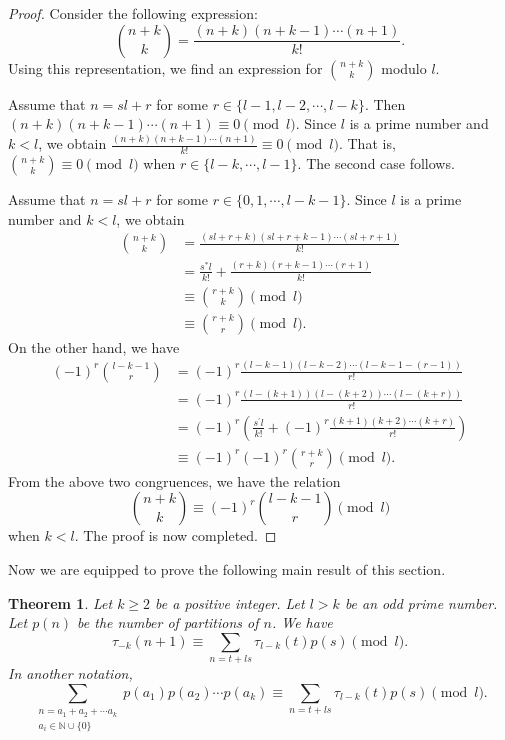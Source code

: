 \documentclass[10pt]{article}
\newtheorem{theorem}{Theorem}[section]
\theoremstyle{definition}
\begin{document}
\begin{proof}
Consider the following expression:
\[{{n+k}\choose{k}}=\frac{(n+k)(n+k-1)\cdots (n+1)}{k!}.
\]
Using this representation, we find an expression for ${n+k}\choose{k}$ modulo $l$. 

Assume that $n=sl+r$ for some $r\in\{l-1,l-2,\cdots ,l-k\}$. Then $(n+k)(n+k-1)\cdots (n+1)\equiv 0\pmod{l}$. Since $l$ is a prime number and $k<l$, we obtain $\frac{(n+k)(n+k-1)\cdots (n+1)}{k!}\equiv0\pmod{l}$. That is, ${{n+k}\choose{k}}\equiv 0\pmod{l}$ when $r\in\{l-k,\cdots ,l-1\}$. The second case follows. 

Assume that $n=sl+r$ for some $r\in\{0,1,\cdots ,l-k-1\}$. Since $l$ is a prime number and $k<l$, we obtain
\begin{align*}
{{n+k}\choose{k}}&=\frac{(sl+r+k)(sl+r+k-1)\cdots (sl+r+1)}{k!}\\
&=\frac{s^{*}l}{k!}+\frac{(r+k)(r+k-1)\cdots (r+1)}{k!}\\
&\equiv {{r+k}\choose {k}}\pmod{l}\\
&\equiv{{r+k}\choose{r}}\pmod{l}.
\end{align*}
On the other hand, we have
\begin{align*}
(-1)^r{{l-k-1}\choose{r}}&=(-1)^r\frac{(l-k-1)(l-k-2)\cdots (l-k-1-(r-1))}{r!}\\
&=(-1)^r\frac{(l-(k+1))(l-(k+2))\cdots (l-(k+r))}{r!}\\
&=(-1)^r\left(\frac{s^{'}l}{k!}+(-1)^r\frac{(k+1)(k+2)\cdots (k+r)}{r!}\right)\\
&\equiv (-1)^r(-1)^r{{r+k}\choose{r}}\pmod{l}.
\end{align*}
From the above two congruences, we have the relation
\[{{n+k}\choose{k}}\equiv(-1)^r{{l-k-1}\choose{r}}\pmod{l}
\]
when $k<l$. The proof is now completed.
\end{proof}
Now we are equipped to prove the following main result of this section. 
\begin{theorem}\label{compositionsum}
Let $k\geq 2$ be a positive integer. Let $l> k$ be an odd prime number. Let $p(n)$ be the number of partitions of $n$. We have
\begin{equation}
\tau_{-k}(n+1)\equiv\sum_{n=t+ls}\tau_{l-k}(t)p(s)\pmod{l}.
\end{equation}
In another notation, 
\begin{equation}
\sum_{\substack{{n=a_1+a_2+\cdots a_k}\\{a_{i}\in\mathbb{N}\cup\{0\}}}}p(a_{1})p(a_{2})\cdots p(a_{k})\equiv \sum_{n=t+ls}\tau_{l-k}(t)p(s)\pmod{l}.
\end{equation}
\end{theorem}
\end{document}
